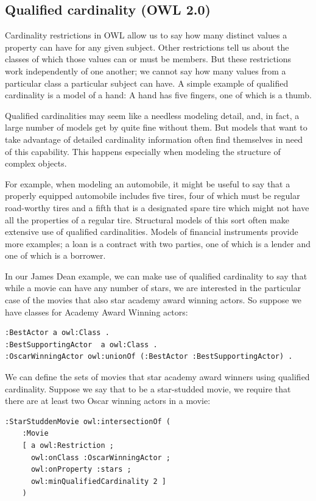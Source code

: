 \subsection{Qualified cardinality (OWL 2.0)}

Cardinality restrictions in OWL allow us to say how many distinct values
a property can have for any given subject. Other restrictions tell us
about the classes of which those values can or must be members. But
these restrictions work independently of one another; we cannot say how
many values from a particular class a particular subject can have. A
simple example of qualified cardinality is a model of a hand: A hand has
five fingers, one of which is a thumb.

Qualified cardinalities may seem like a needless modeling detail, and,
in fact, a large number of
models get by quite fine without them. But models that want to take
advantage of detailed cardinality information often find themselves in
need of this capability. This happens especially when modeling
the structure of complex objects.

For example, when modeling an automobile, it might be useful to say that
a properly equipped automobile includes five tires, four of which must
be regular road-worthy tires and a fifth that is a designated spare tire
which might not have all the properties of a regular tire. Structural
models of this sort often make extensive use of qualified cardinalities.
Models of financial instruments provide more examples; a loan is a contract
with two parties, one of which is a lender and one of which is a borrower. 


In our James Dean example, we can make use of qualified cardinality to
say that while a movie can have any number of stars, we are interested 
in the particular case of the movies that also star academy award winning
actors.  So suppose we have classes for Academy Award Winning actors:

\begin{lstlisting}
:BestActor a owl:Class .
:BestSupportingActor  a owl:Class .
:OscarWinningActor owl:unionOf (:BestActor :BestSupportingActor) .
\end{lstlisting}

We can define the sets of movies that star academy award
winners using qualified cardinality.  Suppose we say that to be a star-studded movie, 
we require that there are at least two Oscar winning actors in a movie:


\begin{lstlisting}
:StarStuddenMovie owl:intersectionOf (
    :Movie 
    [ a owl:Restriction ;
      owl:onClass :OscarWinningActor ;
      owl:onProperty :stars ;
      owl:minQualifiedCardinality 2 ] 
    )
\end{lstlisting}

